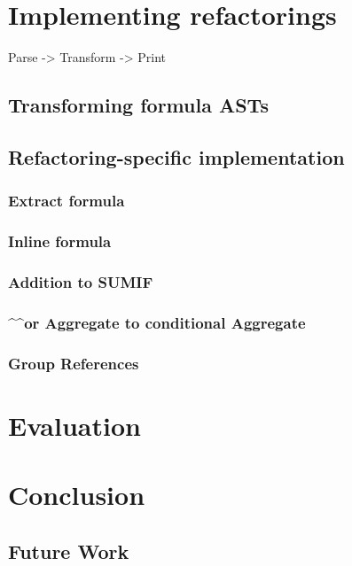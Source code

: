 \documentclass[12pt,a4paper,onecolumn,oneside]{memoir}
\begin{document}
\chapter{Implementing refactorings}

Parse -> Transform -> Print

\section{Transforming formula ASTs}

\section{Refactoring-specific implementation}

\subsection{Extract formula}

\subsection{Inline formula}

\subsection{Addition to SUMIF}

\subsection{\textasciicircum\textasciicircum or Aggregate to conditional Aggregate}

\subsection{Group References}

\chapter{Evaluation}


\chapter{Conclusion}

\section{Future Work}



\end{document}

